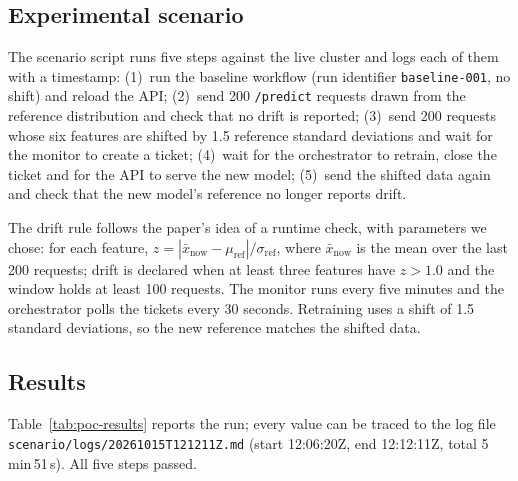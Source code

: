 \documentclass[11pt,a4paper]{article}
\begin{document}
\subsection{Experimental scenario}

The scenario script runs five steps against the live cluster and logs each of them with a timestamp:
(1)~run the baseline workflow (run identifier \texttt{baseline-001}, no shift) and reload the API;
(2)~send 200 \texttt{/predict} requests drawn from the reference distribution and check that no drift is reported;
(3)~send 200 requests whose six features are shifted by 1.5 reference standard deviations and wait for the monitor to create a ticket;
(4)~wait for the orchestrator to retrain, close the ticket and for the API to serve the new model;
(5)~send the shifted data again and check that the new model's reference no longer reports drift.

The drift rule follows the paper's idea of a runtime check, with parameters we chose: for each feature, $z = |\bar{x}_{\text{now}} - \mu_{\text{ref}}| / \sigma_{\text{ref}}$, where $\bar{x}_{\text{now}}$ is the mean over the last 200 requests; drift is declared when at least three features have $z > 1.0$ and the window holds at least 100 requests.
The monitor runs every five minutes and the orchestrator polls the tickets every 30 seconds.
Retraining uses a shift of 1.5 standard deviations, so the new reference matches the shifted data.

\subsection{Results}

Table~\ref{tab:poc-results} reports the run; every value can be traced to the log file \texttt{scenario/logs/20261015T121211Z.md} (start 12:06:20Z, end 12:12:11Z, total 5\,min\,51\,s). All five steps passed.
\end{document}
